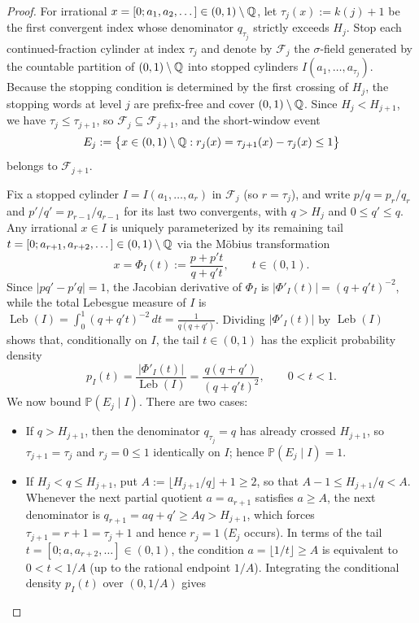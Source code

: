 \begin{proof}
For irrational $x=[0;a_1,a_2,\dots]\in(0,1)\setminus\mathbb{Q}$, let
$\tau_j(x):=k(j)+1$ be the first convergent index whose denominator $q_{\tau_j}$
strictly exceeds $H_j$. Stop each continued-fraction cylinder at index $\tau_j$
and denote by $\mathcal F_j$ the $\sigma$-field generated by the countable
partition of $(0,1)\setminus\mathbb{Q}$ into stopped cylinders
$I(a_1,\dots,a_{\tau_j})$. Because the stopping condition is determined by the
first crossing of $H_j$, the stopping words at level $j$ are prefix-free and cover
$(0,1)\setminus\mathbb{Q}$. Since $H_j<H_{j+1}$, we have $\tau_j\le\tau_{j+1}$, so
$\mathcal F_j\subseteq\mathcal F_{j+1}$, and the short-window event
\[
E_j:=\bigl\{x\in(0,1)\setminus\mathbb{Q}:r_j(x)=\tau_{j+1}(x)-\tau_j(x)\le1\bigr\}
\]
belongs to $\mathcal F_{j+1}$.

Fix a stopped cylinder $I=I(a_1,\dots,a_r)$ in $\mathcal F_j$ (so $r=\tau_j$),
and write $p/q=p_r/q_r$ and $p'/q'=p_{r-1}/q_{r-1}$ for its last two
convergents, with $q>H_j$ and $0\le q'\le q$. Any irrational $x\in I$ is
uniquely parameterized by its remaining tail $t=[0;a_{r+1},a_{r+2},\dots]\in(0,1)\setminus\mathbb{Q}$
via the M\"obius transformation
\[
x=\Phi_I(t):=\frac{p+p't}{q+q't},\qquad t\in(0,1).
\]
Since $|pq'-p'q|=1$, the Jacobian derivative of $\Phi_I$ is
$|\Phi'_I(t)|=(q+q't)^{-2}$, while the total Lebesgue measure of $I$ is
$\operatorname{Leb}(I)=\int_0^1(q+q't)^{-2}\,dt=\frac{1}{q(q+q')}$. Dividing
$|\Phi'_I(t)|$ by $\operatorname{Leb}(I)$ shows that, conditionally on $I$, the
tail $t\in(0,1)$ has the explicit probability density
\[
p_I(t)=\frac{|\Phi'_I(t)|}{\operatorname{Leb}(I)}=\frac{q(q+q')}{(q+q't)^2},
\qquad 0<t<1.
\]
We now bound $\mathbb P(E_j\mid I)$. There are two cases:
\begin{itemize}[leftmargin=1.8em]
\item If $q>H_{j+1}$, then the denominator $q_{\tau_j}=q$ has already crossed
$H_{j+1}$, so $\tau_{j+1}=\tau_j$ and $r_j=0\le1$ identically on $I$; hence
$\mathbb P(E_j\mid I)=1$.
\item If $H_j<q\le H_{j+1}$, put $A:=\lfloor H_{j+1}/q\rfloor+1\ge2$, so that
$A-1\le H_{j+1}/q<A$. Whenever the next partial quotient $a=a_{r+1}$ satisfies
$a\ge A$, the next denominator is $q_{r+1}=aq+q'\ge Aq>H_{j+1}$, which forces
$\tau_{j+1}=r+1=\tau_j+1$ and hence $r_j=1$ ($E_j$ occurs). In terms of the tail
$t=[0;a,a_{r+2},\dots]\in(0,1)$, the condition $a=\lfloor 1/t\rfloor\ge A$ is
equivalent to $0<t<1/A$ (up to the rational endpoint $1/A$). Integrating the
conditional density $p_I(t)$ over $(0,1/A)$ gives

\end{itemize}
\end{proof}
